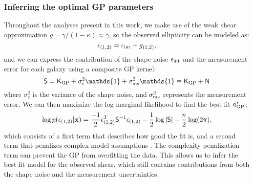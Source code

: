 \subsubsection{Inferring the optimal GP parameters}
Throughout the analyses present in this work, 
we make use of the weak shear approximation 
$g = \gamma / (1 - \kappa)  \approx \gamma$, so the observed ellipticity can be
modeled as: 
\begin{equation}
	\epsilon_{(1, 2)} = \epsilon_{\rm int} + g_{(1, 2)}, 
	\label{eq:weak_shear_approx}
\end{equation}
and we can express the contribution of the shape noise $\epsilon_{\rm int}$
and the measurement error
for each galaxy using a composite GP kernel:
\begin{equation}
	\mathsf{S} = \kerngp_{\rm GP} + \sigma_e^2 \mathds{1}  + \sigma_{\rm ms}^2
	\mathds{1}
	\equiv \kerngp_{\rm GP} + \mathsf{N}
	\label{eq:composite_kernel}
\end{equation}
where $\sigma_e^2$ is the variance of the shape noise, and $\sigma_{\rm ms}^2$
represents the measurement error.
We can then maximize the log marginal likelihood to find the best fit
$a_{\rm GP}^*$: 
\begin{equation}
	\log p(\epsilon_{(1,2)} | \mathbf{x}) = \frac{-1}{2}\epsilon_{(1,2)}^T \mathsf{S}^{-1}
\epsilon_{(1, 2)}
- \frac{1}{2}\log|\mathsf{S}| - \frac{n}{2}\log(2\pi),
\label{eq:log_marginal_likelihood}
\end{equation}
which consists of a first term that describes how good the fit is,
and a second term that penalizes complex model assumptions \citep{Rasmussen2006}. 
The complexity penalization term can prevent the GP from overfitting the data.
This allows us to infer the best fit model for the observed shear, which still
contains contributions from both the shape noise and the measurement
uncertainties. 


